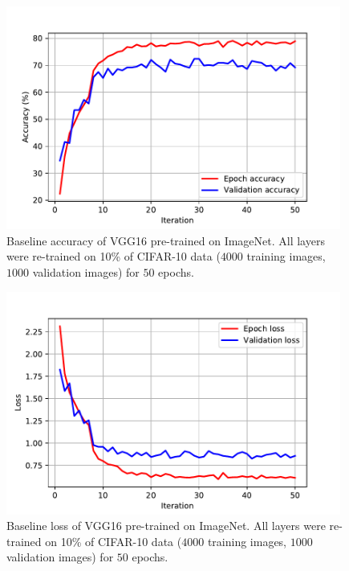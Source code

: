\documentclass{article}
\begin{document}
\begin{figure}[!t]
	\centering
	\includegraphics[width=11cm]{./results/baseline_pre_out_1_in_50_cifar10_10percent_acc.pdf}
	\caption{Baseline accuracy of VGG16 pre-trained on ImageNet. All layers were re-trained on 10\% of CIFAR-10 data ($4000$ training images, $1000$ validation images) for $50$ epochs.}
\end{figure}

\begin{figure}[!t]
	\centering
	\includegraphics[width=11cm]{./results/baseline_pre_out_1_in_50_cifar10_10percent_loss.pdf}
	\caption{Baseline loss of VGG16 pre-trained on ImageNet. All layers were re-trained on 10\% of CIFAR-10 data ($4000$ training images, $1000$ validation images) for $50$ epochs.}
\end{figure}
\end{document}
